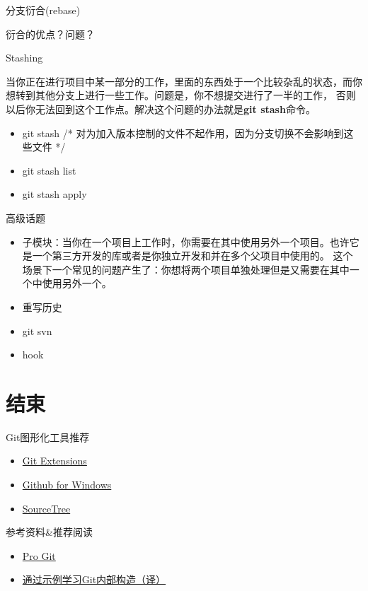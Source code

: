 \documentclass[CJK, 10pt]{beamer}
\begin{document}
\begin{CJK*}{UTF8}{gbsn}
\begin{frame}{分支衍合(rebase)}
\begin{center}
\begin{enumerate}
        \end{enumerate}
        衍合的优点？问题？
    \end{center}
\end{frame}
\begin{frame}{Stashing}
    \begin{block}{}
        当你正在进行项目中某一部分的工作，里面的东西处于一个比较杂乱的状态，而你想转到其他分支上进行一些工作。问题是，你不想提交进行了一半的工作，
        否则以后你无法回到这个工作点。解决这个问题的办法就是\textbf{git stash}命令。
        \begin{itemize}
            \item git stash /* 对为加入版本控制的文件不起作用，因为分支切换不会影响到这些文件 */
            \item git stash list
            \item git stash apply 
        \end{itemize}
    \end{block}
\end{frame}

\begin{frame}{高级话题}
    \begin{itemize}
        \item 子模块：当你在一个项目上工作时，你需要在其中使用另外一个项目。也许它是一个第三方开发的库或者是你独立开发和并在多个父项目中使用的。
            这个场景下一个常见的问题产生了：你想将两个项目单独处理但是又需要在其中一个中使用另外一个。
        \item 重写历史
        \item git svn
        \item hook
    \end{itemize}
\end{frame}

\section{结束}
\begin{frame}{Git图形化工具推荐}
\begin{itemize}
    \item \href{http://gitextensions.codeplex.com/}{Git Extensions}
    \item \href{https://windows.github.com/}{Github for Windows}
    \item \href{http://www.sourcetreeapp.com/}{SourceTree}
\end{itemize}
\end{frame}
\begin{frame}{参考资料\&推荐阅读}
\begin{itemize}
    \item \href{http://git-scm.com/book/zh}{Pro Git}
    \item \href{http://youngsterxyf.github.io/2013/09/28/learning-git-internals-by-example/}{通过示例学习Git内部构造（译）}
\end{itemize}
\end{frame}


\end{CJK*}
\end{document}
